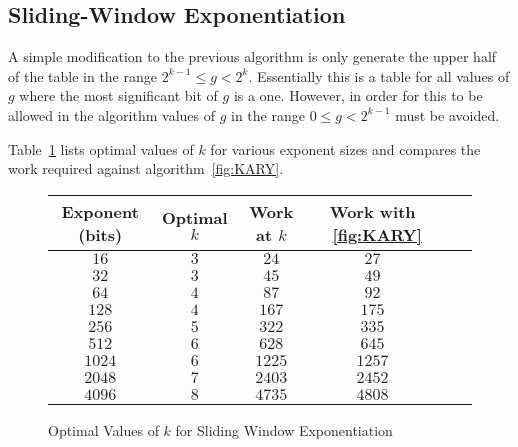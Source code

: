 \documentclass[b5paper]{book}
\begin{document}
\subsection{Sliding-Window Exponentiation}
A simple modification to the previous algorithm is only generate the upper half of the table in the range $2^{k-1} \le g < 2^k$.  Essentially
this is a table for all values of $g$ where the most significant bit of $g$ is a one.  However, in order for this to be allowed in the 
algorithm values of $g$ in the range $0 \le g < 2^{k-1}$ must be avoided.  

Table~\ref{fig:OPTK2} lists optimal values of $k$ for various exponent sizes and compares the work required against algorithm~\ref{fig:KARY}.  

\begin{figure}[here]
\begin{center}
\begin{small}
\begin{tabular}{|c|c|c|c|c|c|}
\hline \textbf{Exponent (bits)} & \textbf{Optimal $k$} & \textbf{Work at $k$} & \textbf{Work with ~\ref{fig:KARY}} \\
\hline $16$ & $3$ & $24$ & $27$ \\
\hline $32$ & $3$ & $45$ & $49$ \\
\hline $64$ & $4$ & $87$ & $92$ \\
\hline $128$ & $4$ & $167$ & $175$ \\
\hline $256$ & $5$ & $322$ & $335$ \\
\hline $512$ & $6$ & $628$ & $645$ \\
\hline $1024$ & $6$ & $1225$ & $1257$ \\
\hline $2048$ & $7$ & $2403$ & $2452$ \\
\hline $4096$ & $8$ & $4735$ & $4808$ \\
\hline
\end{tabular}
\end{small}
\end{center}
\caption{Optimal Values of $k$ for Sliding Window Exponentiation}
\label{fig:OPTK2}
\end{figure}
\end{document}
